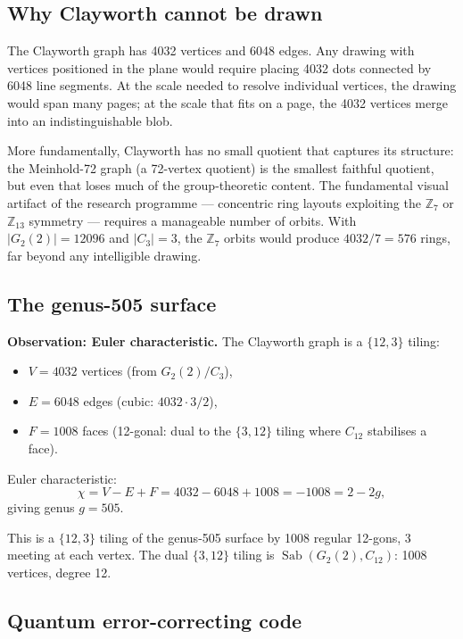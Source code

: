 \documentclass[11pt,a4paper]{article}
\theoremstyle{plain}
\theoremstyle{definition}
\newcommand{\Sab}{\operatorname{Sab}}
\begin{document}
\subsection{Why Clayworth cannot be drawn}

The Clayworth graph has 4032 vertices and 6048 edges. Any drawing with
vertices positioned in the plane would require placing 4032 dots connected by
6048 line segments. At the scale needed to resolve individual vertices, the
drawing would span many pages; at the scale that fits on a page, the 4032
vertices merge into an indistinguishable blob.

More fundamentally, Clayworth has no small quotient that captures its structure:
the Meinhold-72 graph (a 72-vertex quotient) is the smallest faithful quotient,
but even that loses much of the group-theoretic content. The fundamental visual
artifact of the research programme --- concentric ring layouts exploiting the
$\mathbb{Z}_7$ or $\mathbb{Z}_{13}$ symmetry --- requires a manageable number of
orbits. With $|G_2(2)| = 12096$ and $|C_3| = 3$, the $\mathbb{Z}_7$ orbits
would produce $4032/7 = 576$ rings, far beyond any intelligible drawing.

\subsection{The genus-505 surface}

\begin{tcolorbox}[breakable, colback=yellow!12, colframe=yellow!12,
  boxrule=0pt, sharp corners]
\textbf{Observation: Euler characteristic.}
The Clayworth graph is a $\{12,3\}$ tiling:
\begin{itemize}
\item $V = 4032$ vertices (from $G_2(2)/C_3$),
\item $E = 6048$ edges (cubic: $4032 \cdot 3 / 2$),
\item $F = 1008$ faces (12-gonal: dual to the $\{3,12\}$ tiling where $C_{12}$ stabilises a face).
\end{itemize}
Euler characteristic:
\[
\chi = V - E + F = 4032 - 6048 + 1008 = -1008 = 2 - 2g,
\]
giving genus $g = 505$.

This is a $\{12,3\}$ tiling of the genus-505 surface by 1008 regular 12-gons,
3 meeting at each vertex. The dual $\{3,12\}$ tiling is
$\Sab(G_2(2), C_{12})$: 1008 vertices, degree 12.
\end{tcolorbox}

\subsection{Quantum error-correcting code}
\end{document}

